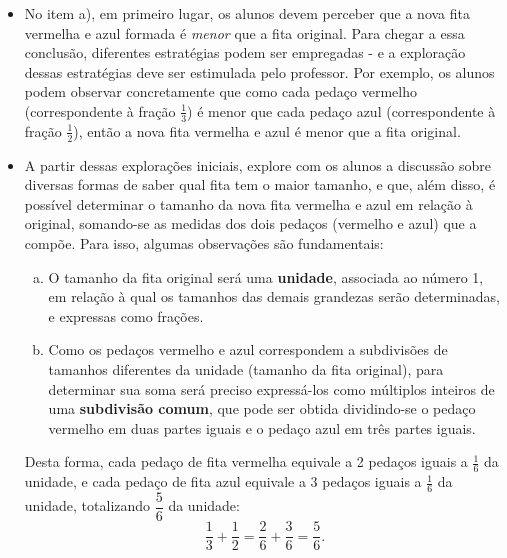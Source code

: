 \begin{multicols}{2}
\begin{itemize}
   \item  No item a), em primeiro lugar, os alunos devem perceber que a nova fita vermelha e azul formada é {\it menor} que a fita original. Para chegar a essa conclusão, diferentes estratégias podem ser empregadas - e a exploração dessas estratégias deve ser estimulada pelo professor. Por exemplo, os alunos podem observar concretamente que como cada pedaço vermelho (correspondente à fração $\frac{1}{3}$) é menor que cada pedaço azul (correspondente à fração $\frac{1}{2}$), então a nova fita vermelha e azul é menor que a fita original.
  \item  A partir dessas explorações iniciais, explore com os alunos a discussão sobre diversas formas de saber qual fita tem o maior tamanho, e que, além disso, é possível determinar o tamanho da nova fita vermelha e azul em relação à original, somando-se as medidas dos dois pedaços (vermelho e azul) que a compõe. Para isso, algumas observações são fundamentais:
  \begin{enumerate}[a)]
    \item O tamanho da fita original será uma {\bf unidade}, associada ao número 1, em relação à qual os tamanhos das demais grandezas serão determinadas, e expressas como frações.
    \item Como os pedaços vermelho e azul correspondem a subdivisões de tamanhos diferentes da unidade (tamanho da fita original), para determinar sua soma será preciso expressá-los como múltiplos inteiros de uma {\bf subdivisão comum}, que pode ser obtida dividindo-se o pedaço vermelho em duas partes iguais e o pedaço azul em três partes iguais.
 \end{enumerate}


\begin{center}
\end{center}


Desta forma, cada pedaço de fita vermelha equivale a 2 pedaços iguais a $\frac{1}{6}$ da unidade, e cada pedaço de fita azul equivale a 3 pedaços iguais a $\frac{1}{6}$ da unidade, totalizando $\dfrac{5}{6}$ da unidade:
$$\dfrac{1}{3} + \dfrac{1}{2} = \dfrac{2}{6} + \dfrac{3}{6} = \dfrac{5}{6}.$$


\end{itemize}
\end{multicols}
